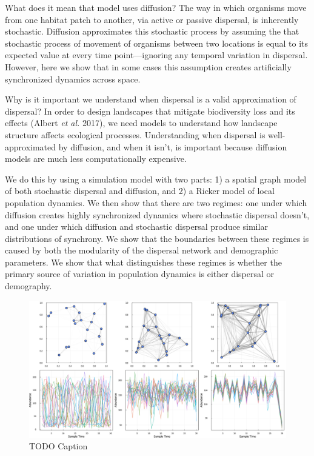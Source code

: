 \documentclass[11pt]{article}
\makeatletter
\def\maxwidth{\ifdim\Gin@nat@width>\linewidth\linewidth
\else\Gin@nat@width\fi}
\let\Oldincludegraphics\includegraphics
\renewcommand{\includegraphics}[1]{\Oldincludegraphics[width=\maxwidth]{#1}}
\makeatother
\begin{document}
What does it mean that model uses diffusion? The way in which organisms
move from one habitat patch to another, via active or passive dispersal,
is inherently stochastic. Diffusion approximates this stochastic process
by assuming the that stochastic process of movement of organisms between
two locations is equal to its expected value at every time
point---ignoring any temporal variation in dispersal. However, here we
show that in some cases this assumption creates artificially
synchronized dynamics across space.

Why is it important we understand when dispersal is a valid
approximation of dispersal? In order to design landscapes that mitigate
biodiversity loss and its effects (Albert \emph{et al.} 2017), we need
models to understand how landscape structure affects ecological
processes. Understanding when dispersal is well-approximated by
diffusion, and when it isn't, is important because diffusion models are
much less computationally expensive.

We do this by using a simulation model with two parts: 1) a spatial
graph model of both stochastic dispersal and diffusion, and 2) a Ricker
model of local population dynamics. We then show that there are two
regimes: one under which diffusion creates highly synchronized dynamics
where stochastic dispersal doesn't, and one under which diffusion and
stochastic dispersal produce similar distributions of synchrony. We show
that the boundaries between these regimes is caused by both the
modularity of the dispersal network and demographic parameters. We show
that what distinguishes these regimes is whether the primary source of
variation in population dynamics is either dispersal or demography.

\begin{figure}
\hypertarget{fig:example}{%
\centering
\includegraphics{./figures/synchrony_example.png}
\caption{TODO Caption}\label{fig:example}
}
\end{figure}
\end{document}
